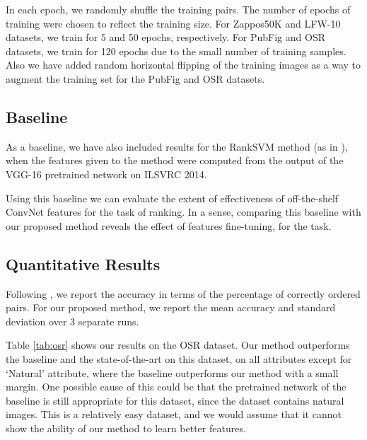 In each epoch, we randomly shuffle the training pairs. The number of epochs of training were chosen to reflect the training size. For Zappos50K and LFW-10 datasets, we train for 5 and 50 epochs, respectively. For PubFig and OSR datasets, we train for 120 epochs due to the small number of training samples. Also we have added random horizontal flipping of the training images as a way to augment the training set for the PubFig and OSR datasets.

\subsection{Baseline}

As a baseline, we have also included results for the RankSVM method (as in \cite{parikh2011}), when the features given to the method were computed from the output of the VGG-16 pretrained network on ILSVRC 2014. 

Using this baseline we can evaluate the extent of effectiveness of off-the-shelf ConvNet features \cite{offtheshelf}  for the task of ranking. In a sense, comparing this baseline with our proposed method reveals the effect of features fine-tuning, for the task. 

\subsection{Quantitative Results}

Following \cite{parikh2011, Yu2014, Sandeep_2014_CVPR}, we report the accuracy in terms of the percentage of correctly ordered pairs. For our proposed method, we report the mean accuracy and standard deviation over 3 separate runs. 

Table \ref{tab:osr} shows our results on the OSR dataset. Our method outperforms the baseline and the state-of-the-art on this dataset, on all attributes except for `Natural' attribute, where the baseline outperforms our method with a small margin. One possible cause of this could be that the pretrained network of the baseline is still appropriate for this dataset, since the dataset contains natural images. This is a relatively easy dataset, and we would assume that it cannot show the ability of our method to learn better features.

